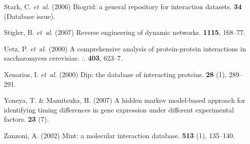 \documentclass{bioinfo}
\begin{document}
\begin{thebibliography}{}
Stark, C. {\em et~al.} (2006{\em{}}) Biogrid: a general repository for interaction
  datasets.
 {\bf 34} (Database issue).

Stigler, B. {\em et~al.} (2007{\em{}})
  Reverse engineering of dynamic networks.
 {\bf 1115}, 168--77.

Uetz, P. {\em et~al.} (2000{\em{}}) A
  comprehensive analysis of protein-protein interactions in saccharomyces
  cerevisiae. :.
 {\bf 403}, 623--7.

Xenarios, I. {\em et~al.} (2000{\em{}}) Dip: the database of interacting proteins.
 {\bf 28} (1), 289--291.

Yoneya, T. \& Mamitsuka, H. (2007{\em{}}) A hidden markov model-based approach
  for identifying timing differences in gene expression under different
  experimental factors.
 {\bf 23} (7).

Zanzoni, A. (2002{\em{}}) Mint: a molecular interaction database.
 {\bf 513} (1), 135--140.
\end{thebibliography}
\end{document}
